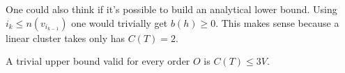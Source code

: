 \documentclass{article}
\begin{document}
One could also think if it's possible to build an analytical lower bound. Using $i_k \leq n(v_{i_{k-1}})$ one would trivially get $b(h) \geq 0$. This makes sense because a linear cluster takes only has $C(T) = 2$.

A trivial upper bound valid for every order $O$ is $C(T) \leq 3V$.


\end{document}
